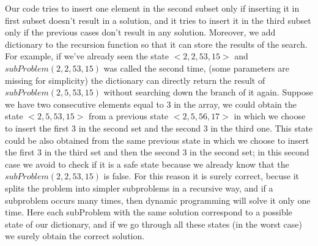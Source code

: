 \documentclass{article}
\begin{document}
Our code tries to insert one element in the second subset only if inserting it in first subset doesn’t result in a solution, and it tries to insert it in the third subset only if the previous cases don’t result in any solution.
Moreover, we add dictionary to the recursion function so that it can store the results of the search.
For example, if we've already seen the state $<2,2,53,15>$ and $subProblem(2, 2, 53, 15)$ was called the second time, (some parameters are missing for simplicity) the dictionary can directly return the result of $subProblem(2, 5, 53, 15)$ without searching down the branch of it again. Suppose we have two consecutive elements equal to 3 in the array, we could obtain the state $<2, 5, 53, 15>$ from a previous state $<2, 5, 56, 17>$ in which we choose to insert the first 3 in the second set and the second 3 in the third one. This state could be also obtained from the same previous state in which we choose to insert the first 3 in the third set and then the second 3 in the second set; in this second case we avoid to check if it is a safe state because we already know that the $subProblem(2, 2, 53, 15)$ is false.
For this reason it is surely correct, becuse it splits the problem into simpler subproblems in a recursive way, and if a subproblem occurs many times, then dynamic programming will solve it only one time. Here each subProblem with the same solution correspond to a possible state of our dictionary, and if we go through all these states (in the worst case) we surely obtain the correct solution.
\newpage
\end{document}
